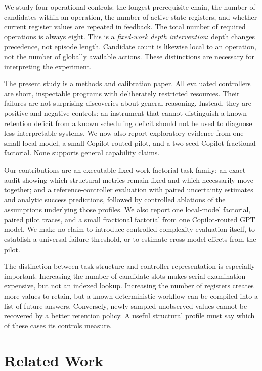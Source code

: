 \documentclass[sigconf,nonacm]{acmart}
\begin{document}
We study four operational controls: the longest prerequisite chain,
the number of candidates within an operation, the number of active state
registers, and whether current register values are repeated in feedback.
The total number of required operations is always eight. This is a
\emph{fixed-work depth intervention}: depth changes precedence, not episode
length. Candidate count is likewise local to an operation, not the number
of globally available actions. These distinctions are necessary for
interpreting the experiment.

The present study is a methods and calibration paper. All evaluated
controllers are short, inspectable programs with deliberately restricted
resources. Their failures are not surprising discoveries about general
reasoning. Instead, they are positive and negative controls: an instrument
that cannot distinguish a known retention deficit from a known scheduling
deficit should not be used to diagnose less interpretable systems. We now
also report exploratory evidence from one small local model, a small
Copilot-routed pilot, and a two-seed Copilot fractional factorial. None
supports general capability claims.

Our contributions are an executable fixed-work factorial task family;
an exact audit showing which structural metrics remain fixed and which
necessarily move together; and a reference-controller evaluation with
paired uncertainty estimates and analytic success predictions, followed
by controlled ablations of the assumptions underlying those profiles. We
also report one local-model factorial, paired pilot traces, and a small
fractional factorial from one Copilot-routed GPT model.
We make no claim to introduce controlled complexity evaluation itself,
to establish a universal failure threshold, or to estimate cross-model
effects from the pilot.

The distinction between task structure and controller representation is
especially important. Increasing the number of candidate slots makes
serial examination expensive, but not an indexed lookup. Increasing the
number of registers creates more values to retain, but a known deterministic
workflow can be compiled into a list of future answers. Conversely, newly
sampled unobserved values cannot be recovered by a better retention policy.
A useful structural profile must say which of these cases its controls
measure.

\section{Related Work}
\end{document}
